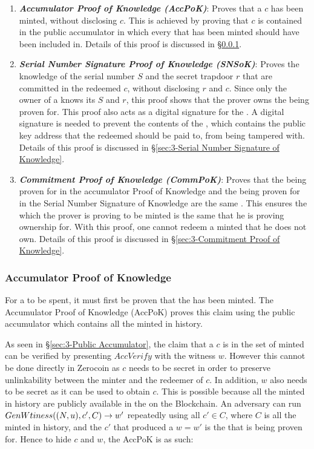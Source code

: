 \begin{enumerate}
	\item \textbf{\textit{Accumulator Proof of Knowledge (AccPoK)}}: Proves that a \kwCoin{} $c$ has been minted, without disclosing $c$. This is achieved by proving that $c$ is contained in the public accumulator in which every \kwCoin{} that has been minted should have been included in. Details of this proof is discussed in \S\ref{sec:3-Accumulator Proof of Knowledge}.
	\item \textbf{\textit{Serial Number Signature Proof of Knowledge (SNSoK)}}: Proves the knowledge of the serial number $S$ and the secret trapdoor $r$ that are committed in the redeemed \kwCoin{} $c$, without disclosing $r$ and $c$. Since only the owner of a \kwCoin{} knows its $S$ and $r$, this proof shows that the prover owns the \kwCoin{} being proven for. This proof also acts as a digital signature for the . A digital signature is needed to prevent the contents of the , which contains the public key address that the redeemed \kwCoin{} should be paid to, from being tampered with. Details of this proof is discussed in \S\ref{sec:3-Serial Number Signature of Knowledge}. 
	\item \textbf{\textit{Commitment Proof of Knowledge (CommPoK)}}: Proves that the \kwCoin{} being proven for in the accumulator Proof of Knowledge and the \kwCoin{} being proven for in the Serial Number Signature of Knowledge are the same \kwCoin{}. This ensures the \kwCoin{} which the prover is proving to be minted is the same \kwCoin{} that he is proving ownership for. With this proof, one cannot redeem a minted \kwCoin{} that he does not own. Details of this proof is discussed in \S\ref{sec:3-Commitment Proof of Knowledge}. 
\end{enumerate}

\subsubsection{Accumulator Proof of Knowledge}
\label{sec:3-Accumulator Proof of Knowledge}
For a \kwCoin{} to be spent, it must first be proven that the \kwCoin{} has been minted. The Accumulator Proof of Knowledge (AccPoK) proves this claim using the public accumulator which contains all the minted  in history.

As seen in \S\ref{sec:3-Public Accumulator}, the claim that a \kwCoin{} $c$ is in the set of minted  can be verified by presenting $AccVerify$ with the witness $w$. However this cannot be done directly in Zerocoin as $c$ needs to be secret in order to preserve unlinkability between the minter and the redeemer of $c$. In addition, $w$ also needs to be secret as it can be used to obtain $c$. This is possible because all the minted  in history are publicly available in the  on the Blockchain. An adversary can run $GenWtiness((N,u),c',C)\rightarrow w'$ repeatedly using all $c'\in C$, where $C$ is all the minted  in history, and the $c'$ that produced a $w=w'$ is the \kwCoin{} that is being proven for. Hence to hide $c$ and $w$, the AccPoK is as such:

